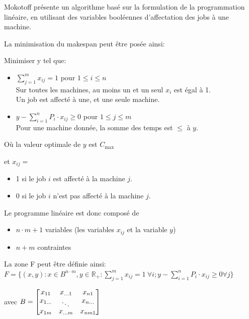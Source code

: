 \documentclass[a4paper,12pt]{report}
\theoremstyle{plain}				%
\theoremstyle{definition}				%
\newcommand{\tdi}[1]{\todo[inline]{{#1}}{}}
\begin{document}
Mokotoff \cite{mokoto1999scheduling} présente un algorithme basé sur
la formulation de la programmation linéaire, en utilisant des
variables booléennes d'affectation des jobs à une machine.

\tdi{LP: définir $x_{ij}$}
\bigskip
La minimisation du makespan peut être posée ainsi:

Minimiser y tel que:

\begin{itemize}
\item $\sum_{j=1}^{m}x_{ij}=1$ \quad pour $1 \leq i \leq n$ 		\\
Sur toutes les machines, au moins un et un seul $x_i$ est égal à 1.	\\
Un job est affecté à une, et une seule machine.

\item $y-\sum_{i=1}^{n}P_i \cdot x_{ij} \geq 0$ \quad pour $1 \leq j \leq m$ \\
Pour une machine donnée, la somme des temps est $\leq$ à $y$.
\end{itemize}

\bigskip
Où	\quad	la valeur optimale de $y$ est $C_{\max}$

et	\quad	$x_{ij} =$

\begin{itemize}
\item 1 si le job $i$ est affecté à la machine $j$.
\item 0 si le job $i$ n'est pas affecté à la machine $j$.
\end{itemize}

 \bigskip
 Le programme linéaire est donc composé de
 \begin{itemize}
 \item $n \cdot m + 1$ variables (les variables $x_{ij}$ et la variable $y$)
 \item $n+m$ contraintes
 \end{itemize}

\bigskip
La zone F peut être définie ainsi: \\
$F=\{ (x,y) : x \in B^{n \cdot m}, y \in \mathbb{R_+} : \sum_{j=1}^{m} x_{ij}=1 ~ \forall i;
y-\sum_{i=1}^{n} P_i \cdot x_{ij} \geq 0 \forall j \}$

avec $B=\begin{bmatrix}
x_{11}&x_{\dots 1}&x_{n1}\\
x_{1 \dots}& \rotatebox{-30}{\dots}&x_{n \dots}\\
x_{1m}&x_{\dots m}&x_{nm1}
\end{bmatrix}$
\end{document}

